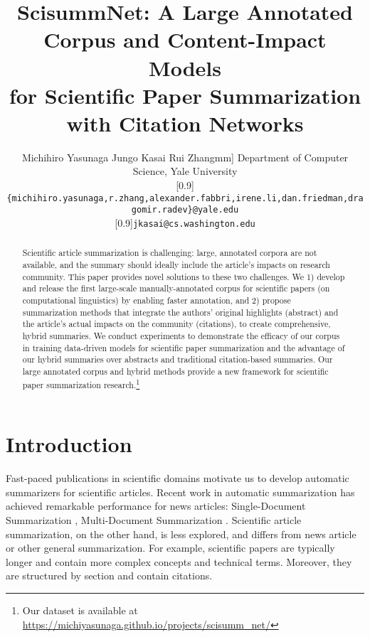 \documentclass[letterpaper]{article} \usepackage{aaai19}  \usepackage{times}  \usepackage{helvet}  \usepackage{courier}  \usepackage{url}
\begin{document}
\setlength{\abovedisplayskip}{4pt}
\setlength{\belowdisplayskip}{3pt}
\title{ScisummNet: A Large Annotated Corpus and Content-Impact Models\\ for Scientific Paper Summarization with Citation Networks}

\author{{\large Michihiro Yasunaga \quad\quad Jungo Kasai \quad\quad Rui Zhang}\1mm]
Department of Computer Science, Yale University\\
\scalebox{0.85}[0.9]{{\tt \{michihiro.yasunaga,r.zhang,alexander.fabbri,irene.li,dan.friedman,dragomir.radev\}@yale.edu}}\\
\scalebox{0.85}[0.9]{{\tt jkasai@cs.washington.edu}}
}
\maketitle


\begin{abstract}
\vspace{-1mm}
Scientific article summarization is challenging:
large, annotated corpora are not available,
and
the summary should ideally
include
the article's impacts
on research community.
This paper provides novel
solutions to these two challenges.
We
1)
develop and release the first large-scale manually-annotated corpus for scientific papers (on computational linguistics) by enabling faster annotation,
and
2)
propose summarization methods that integrate the authors' original highlights (abstract) and the article's actual impacts on the community (citations), to create comprehensive, hybrid summaries.
We conduct experiments to demonstrate the efficacy of our corpus in training data-driven models for scientific paper summarization and the advantage of our hybrid summaries over abstracts and traditional citation-based summaries.
Our large annotated corpus and hybrid methods provide a new framework for scientific paper summarization research.\footnote{Our dataset is available at \url{https://michiyasunaga.github.io/projects/scisumm_net/}}
\vspace{-2mm}
\end{abstract}

\section{Introduction}
Fast-paced publications in scientific domains motivate us to develop
automatic summarizers for
scientific articles.
Recent work in automatic summarization has achieved remarkable performance for news articles:
Single-Document Summarization \cite{parveen-ramsl-strube:2015:EMNLP,cheng-lapata:2016:P16-1,see2017get,narayan2018ranking}, Multi-Document Summarization \cite{hong-nenkova:2014:EACL,cao2015ranking,cao2017improving}.
Scientific article summarization, on the other hand,
is less explored, and differs from news article or other general summarization.
For example, scientific papers are typically longer and contain more complex concepts and technical terms.
Moreover, they are structured by section and contain citations.
\end{document}
